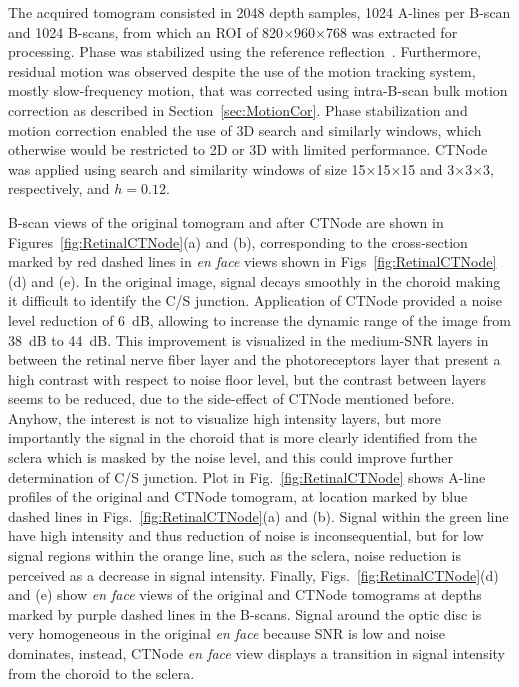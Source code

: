 The acquired tomogram consisted in 2048 depth samples, 1024 A-lines per B-scan and 1024 B-scans, from which an ROI of 820$\times$960$\times$768 was extracted for processing. Phase was stabilized using the reference reflection~\cite{Vakoc2005_Phaseresolved}. Furthermore, residual motion was observed despite the use of the motion tracking system, mostly slow-frequency motion, that was corrected using intra-B-scan bulk motion correction as described in Section~\ref{sec:MotionCor}. Phase stabilization and motion correction enabled the use of 3D search and similarly windows, which otherwise would be restricted to 2D or 3D with limited performance. CTNode was applied using search and similarity windows of size 15$\times$15$\times$15 and 3$\times$3$\times$3, respectively, and $h=0.12$.

B-scan views of the original tomogram and after CTNode are shown in Figures~\ref{fig:RetinalCTNode}(a) and (b), corresponding to the cross-section marked by red dashed lines in \textit{en face} views shown in Figs~\ref{fig:RetinalCTNode}(d) and (e). In the original image, signal decays smoothly in the choroid making it difficult to identify the C/S junction. Application of CTNode provided a noise level reduction of 6~dB, allowing to increase the dynamic range of the image from 38~dB to 44~dB. This improvement is visualized in the medium-SNR layers in between the retinal nerve fiber layer and the photoreceptors layer that present a high contrast with respect to noise floor level, but the contrast between layers seems to be reduced, due to the side-effect of CTNode mentioned before. Anyhow, the interest is not to visualize high intensity layers, but more importantly the signal in the choroid that is more clearly identified from the sclera which is masked by the noise level, and this could improve further determination of C/S junction. Plot in Fig.~\ref{fig:RetinalCTNode} shows A-line profiles of the original and CTNode tomogram, at location marked by blue dashed lines in Figs.~\ref{fig:RetinalCTNode}(a) and (b). Signal within the green line have high intensity and thus reduction of noise is inconsequential, but for low signal regions within the orange line, such as the sclera, noise reduction is perceived as a decrease in signal intensity. Finally, Figs.~\ref{fig:RetinalCTNode}(d) and (e) show \textit{en face} views of the original and CTNode tomograms at depths marked by purple dashed lines in the B-scans. Signal around the optic disc is very homogeneous in the original \textit{en face} because SNR is low and noise dominates, instead, CTNode \textit{en face} view displays a transition in signal intensity from the choroid to the sclera. 

